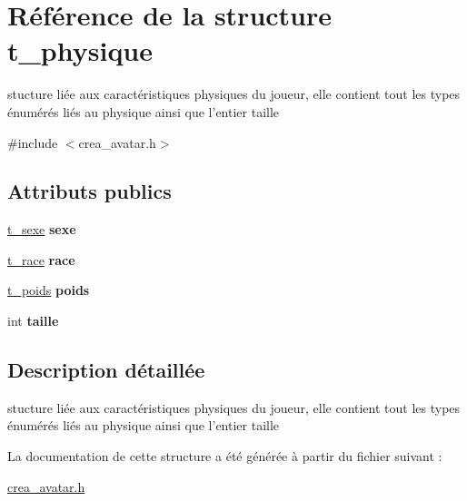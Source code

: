 \hypertarget{structt__physique}{\section{Référence de la structure t\-\_\-physique}
\label{structt__physique}
}


stucture liée aux caractéristiques physiques du joueur, elle contient tout les types énumérés liés au physique ainsi que l'entier taille  




{\ttfamily \#include $<$crea\-\_\-avatar.\-h$>$}

\subsection*{Attributs publics}
\begin{DoxyCompactItemize}
\item 
\hypertarget{structt__physique_a45e61c51296875634b7f935f37e398af}{\hyperlink{crea__avatar_8h_ab79b8b73374184bdb09815f42faf71d2}{t\-\_\-sexe} {\bfseries sexe}}\label{structt__physique_a45e61c51296875634b7f935f37e398af}

\item 
\hypertarget{structt__physique_aee898e6f84d88b1ea123d460d9111243}{\hyperlink{crea__avatar_8h_a19a43ab9ed01d10cbe6f2ce5c66bddd0}{t\-\_\-race} {\bfseries race}}\label{structt__physique_aee898e6f84d88b1ea123d460d9111243}

\item 
\hypertarget{structt__physique_afe45de5fc792902a846669de1e507ffa}{\hyperlink{crea__avatar_8h_ab4911c9a417df91a9f5c845a14653650}{t\-\_\-poids} {\bfseries poids}}\label{structt__physique_afe45de5fc792902a846669de1e507ffa}

\item 
\hypertarget{structt__physique_ac42b018cf4f043812c7eaa1ce496916d}{int {\bfseries taille}}\label{structt__physique_ac42b018cf4f043812c7eaa1ce496916d}

\end{DoxyCompactItemize}


\subsection{Description détaillée}
stucture liée aux caractéristiques physiques du joueur, elle contient tout les types énumérés liés au physique ainsi que l'entier taille 

La documentation de cette structure a été générée à partir du fichier suivant \-:\begin{DoxyCompactItemize}
\item 
\hyperlink{crea__avatar_8h}{crea\-\_\-avatar.\-h}\end{DoxyCompactItemize}

